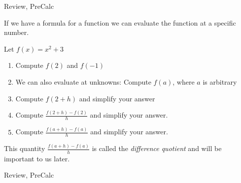 \begin{tagblock}{Review, PreCalc}
\begin{question}

If we have a formula for a function we can evaluate the function at a specific number.

Let $f(x) = x^2 + 3$
\begin{enumerate}
\item Compute $f(2)$ and $f(-1)$
\item We can also evaluate at unknowns:  Compute $f(a)$, where $a$ is arbitrary
\item Compute $f(2+h)$ and simplify your answer
\item Compute $\displaystyle \frac{f(2+h) - f(2)} {h}$ and simplify your answer.  
\item Compute $\displaystyle \frac{f(a+h) - f(a)} {h}$ and simplify your answer.  
\end{enumerate}

This quantity $\displaystyle \frac{f(a+h) - f(a)} {h}$ is called the \emph{difference quotient} and will be important to us later.



	
 

\begin{tags}
	    Review, PreCalc
\end{tags}
	
\begin{diary}
	    
\end{diary}
	
\begin{solution}
		
\end{solution}
	
\end{question}

\end{tagblock}

 
